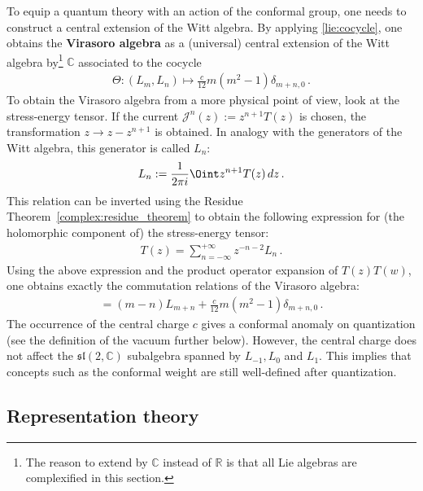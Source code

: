     To equip a quantum theory with an action of the conformal group, one needs to construct a central extension of the Witt algebra. By applying \cref{lie:cocycle}, one obtains the \textbf{Virasoro algebra} as a (universal) central extension of the Witt algebra by\footnote{The reason to extend by $\mathbb{C}$ instead of $\mathbb{R}$ is that all Lie algebras are complexified in this section.} $\mathbb{C}$ associated to the cocycle
    \begin{gather}
        \Theta:(L_m,L_n)\mapsto\frac{c}{12}m(m^2-1)\delta_{m+n,0}\,.
    \end{gather}
    To obtain the Virasoro algebra from a more physical point of view, look at the stress-energy tensor. If the current $\mathcal{J}^n(z) := z^{n+1}T(z)$ is chosen, the transformation $z\longrightarrow z-z^{n+1}$ is obtained. In analogy with the generators of the Witt algebra, this generator is called $L_n$:
    \begin{gather}
        L_n := \frac{1}{2\pi i}\Oint z^{n+1}T(z)\,dz\,.
    \end{gather}
    This relation can be inverted using the Residue Theorem~\ref{complex:residue_theorem} to obtain the following expression for (the holomorphic component of) the stress-energy tensor:
    \begin{gather}
        T(z) = \sum_{n=-\infty}^{+\infty}z^{-n-2}L_n\,.
    \end{gather}
    Using the above expression and the product operator expansion of $T(z)T(w)$, one obtains exactly the commutation relations of the Virasoro algebra:
    \begin{gather}
        [L_m,L_n] = (m-n)L_{m+n} + \frac{c}{12}m(m^2-1)\delta_{m+n,0}\,.
    \end{gather}
    The occurrence of the central charge $c$ gives a conformal anomaly on quantization (see the definition of the vacuum further below). However, the central charge does not affect the $\mathfrak{sl}(2,\mathbb{C})$ subalgebra spanned by $L_{-1},L_0$ and $L_1$. This implies that concepts such as the conformal weight are still well-defined after quantization.

\subsection{Representation theory}


